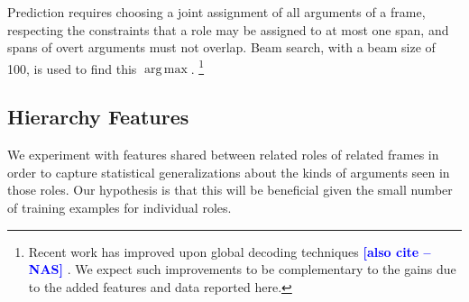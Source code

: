 \documentclass[11pt,a4paper]{article}
\DeclareMathOperator*{\argmax}{arg\,max}
\newcommand{\ensuretext}[1]{#1}
\newcommand{\nssmarker}{\ensuretext{\textcolor{magenta}{\ensuremath{^{\textsc{NS}}_{\textsc{S}}}}}}
\newcommand{\mkmarker}{\ensuretext{\textcolor{red}{\ensuremath{^{\textsc{M}}_{\textsc{K}}}}}}
\newcommand{\arkcomment}[3]{\ensuretext{\textcolor{#3}{[#1 #2]}}}
\newcommand{\nss}[1]{\arkcomment{\nssmarker}{#1}{magenta}}
\newcommand{\mk}[1]{\arkcomment{\mkmarker}{#1}{red}}
\newcommand{\nascomment}[1]{\textcolor{blue}{\textbf{\small [#1 --NAS]}}}
\newcommand{\fnf}[1]{\textsc{\textsf{#1}}} %
\newcommand{\fnr}[1]{\textbf{\textsf{#1}}} %
\begin{document}
Prediction requires choosing a joint assignment of all arguments of a
frame,
respecting the constraints that a role may be assigned to at most one span, and
spans of overt arguments must not overlap.
Beam search, with a beam size of 100, is used to find this $\argmax$.%
\footnote{Recent work has improved upon global decoding techniques
  \nascomment{also cite \citep{das-martins-12}} \citep{tackstrom-15}.
We expect such improvements to be complementary to the gains due to the added features and data reported here.}


\subsection{Hierarchy Features}\label{sec:hierfeats}

We experiment with features shared between related roles of related frames 
in order to capture statistical generalizations about the kinds of arguments 
seen in those roles. 
Our hypothesis is that this will be beneficial given the small number of training examples 
for individual roles.


\end{document}
